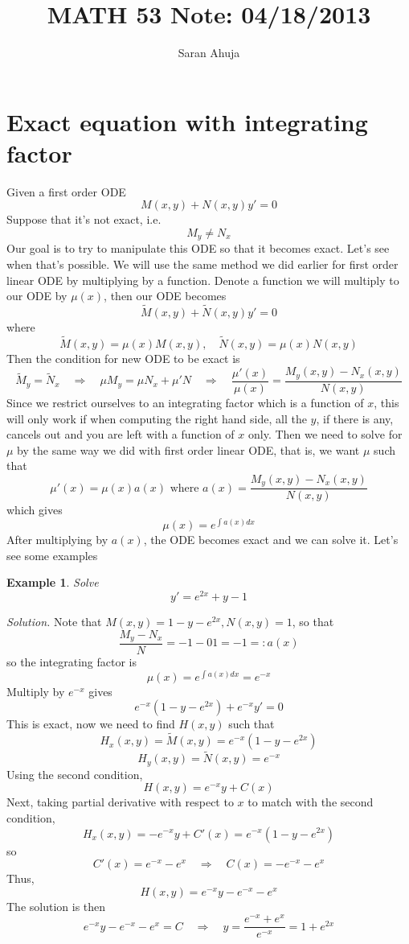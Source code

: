 \documentclass[10pt]{amsart}
\title{MATH 53 Note: 04/18/2013}
\author{Saran Ahuja}
\newtheorem{example}{Example}
\renewcommand{\ni}{\noindent}
\newcommand{\ti}{\textit}
\newcommand{\imply}{ \quad \Rightarrow \quad}
\newcommand{\bex}{\begin{example}}
\newcommand{\eex}{\end{example}}
\newcommand{\tdM}{\tilde{M}}
\newcommand{\tdN}{\tilde{N}}
\newcommand{\Sol}{\ni\ti{Solution. }}
\begin{document}
\maketitle
\section{Exact equation with integrating factor}

\ni Given a first order ODE 
$$ M(x,y)+N(x,y)y' = 0$$
Suppose that it's not exact, i.e.
$$ M_{y} \neq N_{x} $$
Our goal is to try to manipulate this ODE so that it becomes exact. Let's see when that's possible. We will use the same method we did earlier for first order linear ODE by multiplying by a function. Denote a function we will multiply to our ODE by $\mu(x)$, then our ODE becomes
$$ \tdM(x,y) + \tdN(x,y) y' = 0 $$
where
$$ \tdM(x,y) = \mu(x)M(x,y), \quad \tdN(x,y) = \mu(x)N(x,y) $$
Then the condition for new ODE to be exact is
$$ \tdM_{y} = \tdN_{x} \imply \mu M_{y} = \mu N_{x}+\mu' N \imply \frac{\mu'(x)}{\mu(x)} = \frac{M_{y}(x,y)-N_{x}(x,y)}{N(x,y)} $$
Since we restrict ourselves to an integrating factor which is a function of $x$, this will only work if when computing the right hand side, all the $y$, if there is any, cancels out and you are left with a function of $x$ only. Then we need to solve for $\mu$ by the same way we did with first order linear ODE, that is, we want $\mu$ such that
$$ \mu'(x) = \mu(x)a(x) \text{ where }a(x) = \frac{M_{y}(x,y)-N_{x}(x,y)}{N(x,y)}  $$
which gives
$$ \mu(x) = e^{\int a(x) dx} $$
After multiplying by $a(x)$, the ODE becomes exact and we can solve it. Let's see some examples

\vspace{0.2in}
\bex Solve  
$$y' = e^{2x}+y - 1 $$
\eex

\Sol Note that $M(x,y) = 1-y-e^{2x}, N(x,y) = 1$, so that
$$ \frac{M_{y}-N_{x}}{N} = {-1-0}{1} = -1 =: a(x) $$
so the integrating factor is
$$ \mu(x) = e^{\int a(x)dx} = e^{-x} $$
Multiply by $e^{-x}$ gives
$$ e^{-x}(1-y-e^{2x})+ e^{-x}y' = 0 $$
This is exact, now we need to find $H(x,y)$ such that
$$ H_{x}(x,y) = \tdM(x,y) = e^{-x}(1-y-e^{2x}) $$
$$ H_{y}(x,y) = \tdN(x,y) = e^{-x} $$
Using the second condition, 
$$ H(x,y) = e^{-x}y + C(x) $$
Next, taking partial derivative with respect to $x$ to match with the second condition,
$$ H_{x}(x,y) = -e^{-x}y + C'(x)  = e^{-x}(1-y-e^{2x}) $$
so
$$ C'(x) = e^{-x}-e^{x} \imply C(x) = -e^{-x}-e^{x} $$
Thus, 
$$H(x,y) =  e^{-x}y -e^{-x}-e^{x}  $$
The solution is then
$$  e^{-x}y -e^{-x}-e^{x} = C \imply y = \frac{e^{-x}+e^{x}}{e^{-x}} = 1+e^{2x} $$
\end{document}
